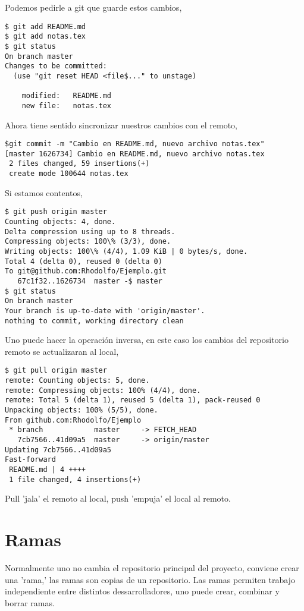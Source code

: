 \documentclass{article}
\begin{document}
Podemos pedirle a git que guarde estos cambios,
\begin{verbatim}
$ git add README.md
$ git add notas.tex
$ git status
On branch master
Changes to be committed:
  (use "git reset HEAD <file$..." to unstage)

	modified:   README.md
	new file:   notas.tex
\end{verbatim}

Ahora tiene sentido sincronizar nuestros cambios con el remoto,
\begin{verbatim}
$git commit -m "Cambio en README.md, nuevo archivo notas.tex"
[master 1626734] Cambio en README.md, nuevo archivo notas.tex
 2 files changed, 59 insertions(+)
 create mode 100644 notas.tex
\end{verbatim}

Si estamos contentos,
\begin{verbatim}
$ git push origin master
Counting objects: 4, done.
Delta compression using up to 8 threads.
Compressing objects: 100\% (3/3), done.
Writing objects: 100\% (4/4), 1.09 KiB | 0 bytes/s, done.
Total 4 (delta 0), reused 0 (delta 0)
To git@github.com:Rhodolfo/Ejemplo.git
   67c1f32..1626734  master -$ master
$ git status
On branch master
Your branch is up-to-date with 'origin/master'.
nothing to commit, working directory clean
\end{verbatim}

Uno puede hacer la operaci\'{o}n inversa, 
en este caso los cambios del repositorio remoto se actualizaran al local,
\begin{verbatim}
$ git pull origin master
remote: Counting objects: 5, done.
remote: Compressing objects: 100% (4/4), done.
remote: Total 5 (delta 1), reused 5 (delta 1), pack-reused 0
Unpacking objects: 100% (5/5), done.
From github.com:Rhodolfo/Ejemplo
 * branch            master     -> FETCH_HEAD
   7cb7566..41d09a5  master     -> origin/master
Updating 7cb7566..41d09a5
Fast-forward
 README.md | 4 ++++
 1 file changed, 4 insertions(+)
\end{verbatim}
Pull 'jala' el remoto al local, push 'empuja' el local al remoto.



\section{Ramas}

Normalmente uno no cambia el repositorio principal del proyecto,
conviene crear una 'rama,' las ramas son copias de un repositorio. 
Las ramas permiten trabajo independiente entre distintos dessarrolladores,
uno puede crear, combinar y borrar ramas.  
\end{document}
